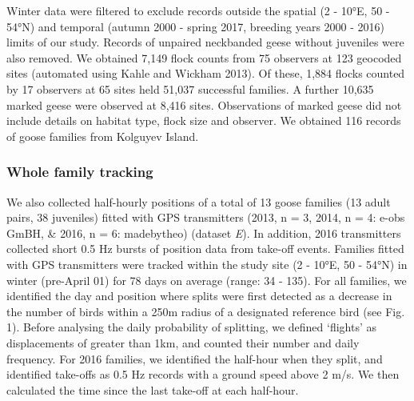 \documentclass[10pt,twocolumn]{paper}
\begin{document}
Winter data were filtered to exclude records outside the spatial (2 -
10°E, 50 - 54°N) and temporal (autumn 2000 - spring 2017, breeding years
2000 - 2016) limits of our study. Records of unpaired neckbanded geese
without juveniles were also removed. We obtained 7,149 flock counts from
75 observers at 123 geocoded sites (automated using Kahle and Wickham
2013). Of these, 1,884 flocks counted by 17 observers at 65 sites held
51,037 successful families. A further 10,635 marked geese were observed
at 8,416 sites. Observations of marked geese did not include details on
habitat type, flock size and observer. We obtained 116 records of goose
families from Kolguyev Island.

\subsubsection{Whole family tracking}\label{whole-family-tracking}

We also collected half-hourly positions of a total of 13 goose families
(13 adult pairs, 38 juveniles) fitted with GPS transmitters (2013, n =
3, 2014, n = 4: e-obs GmBH, \& 2016, n = 6: madebytheo) (dataset
\emph{E}). In addition, 2016 transmitters collected short 0.5 Hz bursts
of position data from take-off events. Families fitted with GPS
transmitters were tracked within the study site (2 - 10°E, 50 - 54°N) in
winter (pre-April 01) for 78 days on average (range: 34 - 135). For all
families, we identified the day and position where splits were first
detected as a decrease in the number of birds within a 250m radius of a
designated reference bird (see Fig. 1). Before analysing the daily
probability of splitting, we defined `flights' as displacements of
greater than 1km, and counted their number and daily frequency. For 2016
families, we identified the half-hour when they split, and identified
take-offs as 0.5 Hz records with a ground speed above 2 m/s. We then
calculated the time since the last take-off at each half-hour.
\end{document}

